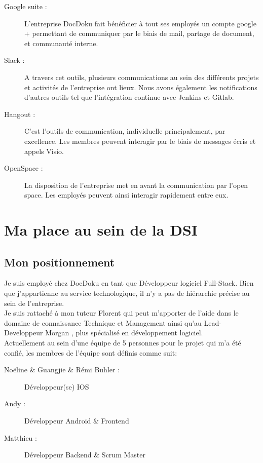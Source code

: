 \documentclass[11pt]{report}
\begin{document}
			\begin{description}
				\item[Google suite :] L'entreprise DocDoku fait bénéficier à tout ses employés un compte google + permettant de communiquer par le biais de mail, partage de document, et communauté interne.
				\item[Slack :] A travers cet outils, plusieurs communications au sein des différents projets et activités de l'entreprise ont lieux. Nous avons également les notifications d'autres outils tel que l'intégration continue avec Jenkins et Gitlab.
				\item[Hangout :] C'est l'outils de communication, individuelle principalement, par excellence. Les membres peuvent interagir par le biais de messages écris et appels Visio.
				\item[OpenSpace :] La disposition de l'entreprise met en avant la communication par l'open space. Les employés peuvent ainsi interagir rapidement entre eux.
			\end{description}

\part{Ma place au sein de la DSI}

	\chapter{Mon positionnement}

		Je suis employé chez DocDoku en tant que Développeur logiciel Full-Stack. Bien que j'appartienne au service technologique, il n'y a pas de hiérarchie précise au sein de l'entreprise.\\

		Je suis rattaché à mon tuteur Florent  qui peut m'apporter de l'aide dans le domaine de connaissance Technique et Management ainsi qu'au Lead-Developpeur Morgan , plus spécialisé en développement logiciel.\\

		Actuellement au sein d'une équipe de 5 personnes pour le projet qui m'a été confié, les membres de l'équipe sont définis comme suit:\\
		\begin{description}
			\item[Noëline  \& Guangjie  \& Rémi Buhler :] Développeur(se) IOS 
			\item[Andy :] Développeur Android \& Frontend
			\item[Matthieu :] Développeur Backend \& Scrum Master
		\end{description}
\end{document}
